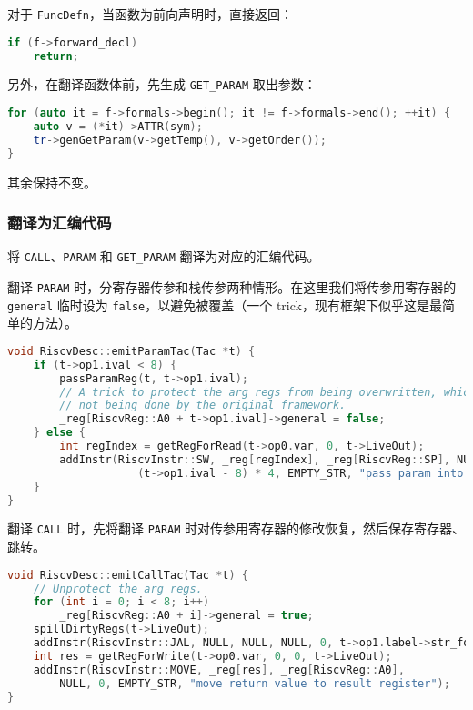\documentclass[a4paper]{article}
\begin{document}
对于 \texttt{FuncDefn}，当函数为前向声明时，直接返回：

\begin{lstlisting}[language=c++]
if (f->forward_decl)
    return;
\end{lstlisting}

另外，在翻译函数体前，先生成 \texttt{GET\_PARAM} 取出参数：

\begin{lstlisting}[language=c++]
for (auto it = f->formals->begin(); it != f->formals->end(); ++it) {
    auto v = (*it)->ATTR(sym);
    tr->genGetParam(v->getTemp(), v->getOrder());
}
\end{lstlisting}

其余保持不变。

\subsubsection{翻译为汇编代码}

将 \texttt{CALL}、\texttt{PARAM} 和 \texttt{GET\_PARAM} 翻译为对应的汇编代码。

翻译 \texttt{PARAM} 时，分寄存器传参和栈传参两种情形。在这里我们将传参用寄存器的 \texttt{general} 临时设为 \texttt{false}，以避免被覆盖（一个 trick，现有框架下似乎这是最简单的方法）。

\begin{lstlisting}[language=c++]
void RiscvDesc::emitParamTac(Tac *t) {
    if (t->op1.ival < 8) {
        passParamReg(t, t->op1.ival);
        // A trick to protect the arg regs from being overwritten, which seems
        // not being done by the original framework.
        _reg[RiscvReg::A0 + t->op1.ival]->general = false;
    } else {
        int regIndex = getRegForRead(t->op0.var, 0, t->LiveOut);
        addInstr(RiscvInstr::SW, _reg[regIndex], _reg[RiscvReg::SP], NULL,
                    (t->op1.ival - 8) * 4, EMPTY_STR, "pass param into stack");
    }
}
\end{lstlisting}

翻译 \texttt{CALL} 时，先将翻译 \texttt{PARAM} 时对传参用寄存器的修改恢复，然后保存寄存器、跳转。

\begin{lstlisting}[language=c++]
void RiscvDesc::emitCallTac(Tac *t) {
    // Unprotect the arg regs.
    for (int i = 0; i < 8; i++)
        _reg[RiscvReg::A0 + i]->general = true;
    spillDirtyRegs(t->LiveOut);
    addInstr(RiscvInstr::JAL, NULL, NULL, NULL, 0, t->op1.label->str_form, EMPTY_STR);
    int res = getRegForWrite(t->op0.var, 0, 0, t->LiveOut);
    addInstr(RiscvInstr::MOVE, _reg[res], _reg[RiscvReg::A0],
        NULL, 0, EMPTY_STR, "move return value to result register");
}
\end{lstlisting}
\end{document}
